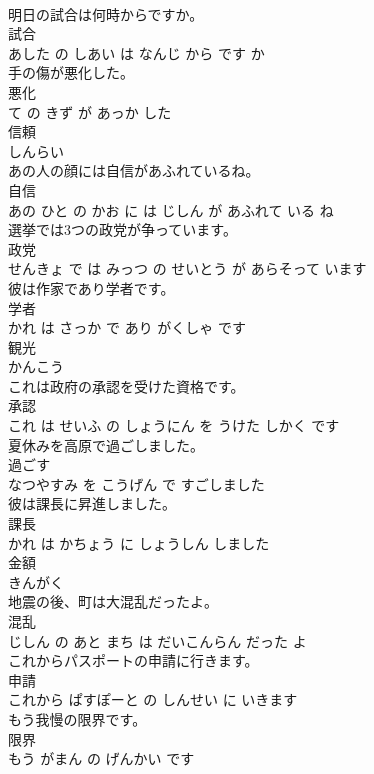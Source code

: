 \documentclass[8pt]{extreport}
\begin{document}
\begin{CJK}{UTF8}{min}
\\	明日の試合は何時からですか。	
\\	試合 
\\	あした の しあい は なんじ から です か		
\\	手の傷が悪化した。	
\\	悪化 
\\	て の きず が あっか した		
\\	信頼	
\\	しんらい		
\\	あの人の顔には自信があふれているね。	
\\	自信 
\\	あの ひと の かお に は じしん が あふれて いる ね		
\\	選挙では3つの政党が争っています。	
\\	政党 
\\	せんきょ で は みっつ の せいとう が あらそって います		
\\	彼は作家であり学者です。	
\\	学者 
\\	かれ は さっか で あり がくしゃ です		
\\	観光	
\\	かんこう		
\\	これは政府の承認を受けた資格です。	
\\	承認 
\\	これ は せいふ の しょうにん を うけた しかく です		
\\	夏休みを高原で過ごしました。	
\\	過ごす 
\\	なつやすみ を こうげん で すごしました		
\\	彼は課長に昇進しました。	
\\	課長 
\\	かれ は かちょう に しょうしん しました		
\\	金額	
\\	きんがく		
\\	地震の後、町は大混乱だったよ。	
\\	混乱 
\\	じしん の あと まち は だいこんらん だった よ		
\\	これからパスポートの申請に行きます。	
\\	申請 
\\	これから ぱすぽーと の しんせい に いきます		
\\	もう我慢の限界です。	
\\	限界 
\\	もう がまん の げんかい です		

\end{CJK}
\end{document}
